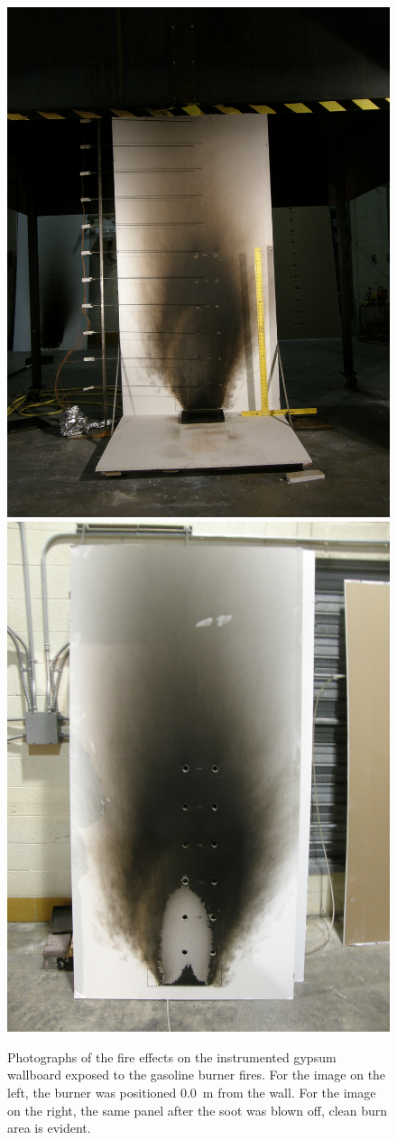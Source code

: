 \documentclass[twoside]{uocthesis}
\begin{document}
\begin{figure}[p]
	\centering
	\includegraphics[trim=10.3in 9.0in 10.3in 20.0in, clip=true, width=0.4\columnwidth]{../Figures/IWGB_Gas5_0m_prebrush}
	\includegraphics[trim=7.0in 3.5in 8.0in 18.5in, clip=true, width=0.4\columnwidth]{../Figures/IWGB_Gas5_0m_postbrush} \\
	\caption[Photographs of the effect of soot removal on the instrumented gypsum wallboard exposed to the gasoline burner fires]{Photographs of the fire effects on the instrumented gypsum wallboard exposed to the gasoline burner fires. For the image on the left, the burner was positioned 0.0~m from the wall.  For the image on the right, the same panel after the soot was blown off, clean burn area is evident.}
	\label{IWGB_Gas_0m_patterns}
\end{figure}
\end{document}
